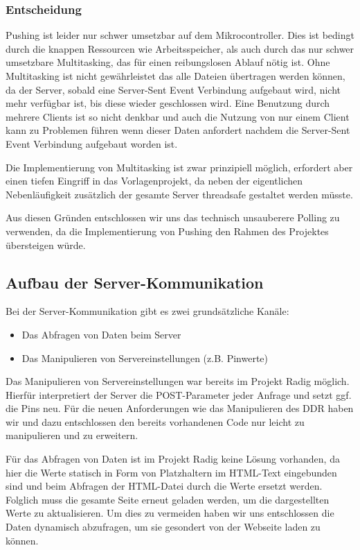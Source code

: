 \subsubsection{Entscheidung}
Pushing ist leider nur schwer umsetzbar auf dem Mikrocontroller. Dies ist
bedingt durch die knappen Ressourcen wie Arbeitsspeicher, als auch durch das nur
schwer umsetzbare Multitasking, das für einen reibungslosen Ablauf nötig ist. Ohne Multitasking
ist nicht gewährleistet das alle Dateien übertragen werden können, da der
Server, sobald eine Server-Sent Event Verbindung aufgebaut wird, nicht mehr
verfügbar ist, bis diese wieder geschlossen wird. Eine Benutzung durch mehrere
Clients ist so nicht denkbar und auch die Nutzung von nur einem Client kann zu
Problemen führen wenn dieser Daten anfordert nachdem die Server-Sent Event
Verbindung aufgebaut worden ist.

Die Implementierung von Multitasking ist zwar prinzipiell möglich, erfordert
aber einen tiefen Eingriff in das Vorlagenprojekt, da neben der eigentlichen
Nebenläufigkeit zusätzlich der gesamte Server threadsafe gestaltet werden
müsste.

Aus diesen Gründen entschlossen wir uns das technisch unsauberere Polling zu
verwenden, da die Implementierung von Pushing den Rahmen des Projektes
übersteigen würde.

\subsection{Aufbau der Server-Kommunikation}

Bei der Server-Kommunikation gibt es zwei grundsätzliche Kanäle:
\begin{itemize}
  \item Das Abfragen von Daten beim Server
  \item Das Manipulieren von Servereinstellungen (z.B. Pinwerte)
\end{itemize}
Das Manipulieren von Servereinstellungen war bereits im Projekt Radig möglich.
Hierfür interpretiert der Server die POST-Parameter jeder Anfrage und setzt ggf.
die Pins neu. Für die neuen Anforderungen wie das Manipulieren des DDR haben
wir und dazu entschlossen den bereits vorhandenen Code nur leicht zu
manipulieren und zu erweitern.

Für das Abfragen von Daten ist im Projekt Radig keine Lösung vorhanden, da hier
die Werte statisch in Form von Platzhaltern im HTML-Text eingebunden sind und
beim Abfragen der HTML-Datei durch die Werte ersetzt werden. Folglich muss die
gesamte Seite erneut geladen werden, um die dargestellten Werte zu
aktualisieren. Um dies zu vermeiden haben wir uns entschlossen die Daten
dynamisch abzufragen, um sie gesondert von der Webseite laden zu können.

